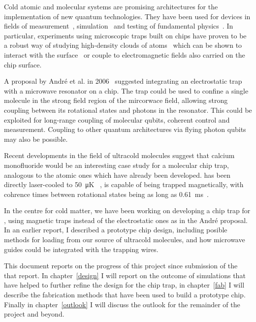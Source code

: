 Cold atomic and molecular systems are promising architectures for the
implementation of new quantum technologies. They have been used for devices in
fields of measurement~\cite{PhysRevLett.120.103201}, simulation~\cite{Gross995}
and testing of fundamental physics~\cite{DeMille990}.  In particular,
experiments using microscopic traps built on chips have proven to be a robust
way of studying high-density clouds of atoms~\cite{Reichel1999, Ott2001} which
can be shown to interact with the surface~\cite{} or couple to electromagnetic
fields also carried on the chip surface.~\cite{Treutlein2008, Hinds??}

A proposal by Andr\'e et al. in 2006~\cite{Andre2006} suggested integrating an
electrostatic trap with a microwave resonator on a chip. The trap could be used
to confine a single molecule in the strong field region of the mircorwace
field, allowing strong coupling between its rotational states and photons in
the resonator. This could be exploited for long-range coupling of molecular
qubits, coherent control and measurement. Coupling to other quantum
architectures via flying photon qubits may also be
possible.~\cite{PhysRevLett.92.063601}

Recent developments in the field of ultracold molecules suggest that calcium
monofluoride would be an interesting case study for a molecular chip trap,
analogous to the atomic ones which have already been developed. \CaF{} has been
directly laser-cooled to \SI{50}{\micro\kelvin} ~\cite{}, is capable of being
trapped magnetically, with cohrence times between rotational states
being as long as
\SI{0.61}{\milli\second}~\cite{Blackmore_2018}. 

In the centre for cold matter, we have been working on developing a chip trap
for \CaF{}, using magnetic traps instead of the electrostatic ones as in the
Andr\'e proposal. In an earlier report, I described a prototype chip design,
including posible methods for loading from our source of ultracold molecules,
and how microwave guides could be integrated with the trapping wires.

This document reports on the progress of this project since submission of the
that report.  In chapter~\ref{design} I will report on the outcome of
simulations that have helped to further refine the design for the chip trap, in
chapter~\ref{fab} I will describe the fabrication methods that have been used
to build a prototype chip. Finally in chapter~\ref{outlook} I will discuss the
outlook for the remainder of the project and beyond.


